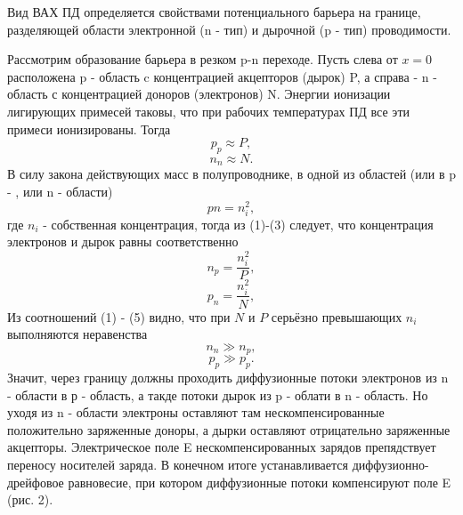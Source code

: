 \documentclass[a4paper]{article}
\begin{document}
Вид ВАХ ПД определяется свойствами потенциального барьера на границе, разделяющей области электронной (n - тип) и дырочной (p - тип) проводимости.

Рассмотрим образование барьера в резком p-n переходе. Пусть слева от $x = 0$ расположена p - область c концентрацией акцепторов (дырок) P, а справа - n - область с концентрацией доноров (электронов) N. Энергии ионизации лигирующих примесей таковы, что при рабочих температурах ПД все эти примеси ионизированы. Тогда
\begin{equation}
    p_p \approx P,
\end{equation}
    \begin{equation}
    n_n \approx N.
\end{equation}
В силу закона действующих масс в полупроводнике, в одной из областей (или в p - , или n - области)
\begin{equation}
    pn = n_i^2,
\end{equation}
где $n_i$ - собственная концентрация, тогда из (1)-(3) следует, что концентрация электронов и дырок равны соответственно
\begin{equation}
    n_p = \frac{n_i^2}{P},
\end{equation}
\begin{equation}
    p_n = \frac{n_i^2}{N},
\end{equation}
Из соотношений (1) - (5) видно, что при $N$ и $P$ серьёзно превышающих $n_i$ выполняются неравенства 
\begin{equation}
    n_n \gg  n_p,
\end{equation}
\begin{equation}
    p_p \gg p_p.
\end{equation}
Значит, через границу должны проходить диффузионные потоки электронов из n - области в р - область, а такде потоки дырок из p - облати в n - область. Но уходя из n - области электроны оставляют там нескомпенсированные положительно заряженные доноры, а дырки оставляют отрицательно заряженные акцепторы. Электрическое поле E нескомпенсированных зарядов препядствует переносу носителей заряда. В конечном итоге устанавливается диффузионно-дрейфовое равновесие, при котором диффузионные потоки компенсируют поле E (рис. 2).
\end{document}
